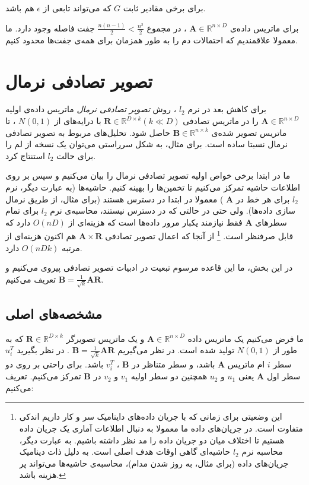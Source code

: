 برای برخی مقادیر ثابت 
$G$
که می‌تواند تابعی از 
$\epsilon$
هم باشد.

برای ماتریس داده‌ی
$\mathbf{A} \in \mathbb{R}^{n \times D}$
، در مجموع 
$\frac{n(n-1)}{2} < \frac{n^2}{2}$
جفت فاصله وجود دارد. ما معمولا علاقمندیم که احتمالات دم را به طور همزمان برای همه‌ی جفت‌ها محدود کنیم. 

\section{
تصویر تصادفی نرمال
\label{SecNormal}
}
برای کاهش بعد در نرم 
$l_2$
، روش 
\textit{
تصویر تصادفی نرمال
}
ماتریس داده‌ی اولیه 
$\mathbf{A} \in \mathbb{R}^{n \times D}$
را در ماتریس تصادفی 
$\mathbf{R} \in \mathbb{R}^{D \times k} (k \ll D)$
با درایه‌های 
از 
$N(0,1)$
، تا ماتریس تصویر شده‌ی 
$\mathbf{B} \in \mathbb{R}^{n \times k}$
حاصل شود. تحلیل‌های مربوط به تصویر تصادفی نرمال نسبتا ساده است. برای مثال، به شکل سرراستی می‌توان یک نسخه از لم 
\cite{litez103}
را برای حالت 
$l_2$
استنتاج کرد.

ما در ابتدا برخی خواص اولیه تصویر تصادفی نرمال را بیان می‌کنیم و سپس بر روی اطلاعات حاشیه تمرکز می‌کنیم تا تخمین‌ها را بهینه کنیم. حاشیه‌ها (به عبارت دیگر، نرم 
$l_2$
برای هر خط در 
$\mathbf{A}$
)
معمولا در ابتدا در دسترس هستند (برای مثال، از طریق نرمال سازی داده‌ها). ولی حتی در حالتی که در دسترس نیستند، محاسبه‌ی نرم 
$l_2$
برای تمام سطرهای 
$\mathbf{A}$
فقط نیازمند یکبار مرور داده‌ها است که هزینه‌ای از 
$O(nD)$
دارد که قابل صرفنظر است.
\footnote{
این وضعیتی برای زمانی که با جریان داده‌های داینامیک سر و کار داریم اندکی متفاوت است. در جریان‌های داده ما معمولا به دنبال اطلاعات آماری یک جریان داده هستیم تا اختلاف میان دو جریان داده را مد نظر داشته باشیم. به عبارت دیگر، محاسبه نرم 
$l_2$
حاشیه‌ای گاهی اوقات هدف اصلی است. به دلیل ذات دینامیک جریان‌های داده (برای مثال، به روز شدن مدام)، محاسبه‌ی حاشیه‌ها می‌تواند پر هزینه باشد.
}
از آنجا که اعمال تصویر تصادفی 
$\mathbf{A} \times \mathbf{R}$
هم اکنون هزینه‌ای از مرتبه 
$O(nDk)$
دارد.

در این بخش، ما این قاعده مرسوم تبعیت در ادبیات تصویر تصادفی 
\cite{litez166}
پیروی می‌کنیم و تعریف می‌کنیم
$\mathbf{B} = \frac{1}{\sqrt{k}} \mathbf{A} \mathbf{R}$.

\subsection{
مشخصه‌های اصلی
}

ما فرض می‌کنیم یک ماتریس داده 
$\mathbf{A} \in \mathbb{R}^{n \times D}$
و یک ماتریس تصویرگر
$\mathbf{R} \in \mathbb{R}^{D \times k}$
که به طور 
از 
$N(0,1)$
تولید شده است. در نظر می‌گیریم
$\mathbf{B} = \frac{1}{\sqrt{k}} \mathbf{A} \mathbf{R}$
.
در نظر بگیرید
$u_i^T$
سطر
$i$
ام ماتریس 
$\mathbf{A}$
باشد، و سطر متناظر در 
$\mathbf{B}$
،
$v_i^T$
باشد.
برای راحتی بر روی دو سطر اول 
$\mathbf{A}$
یعنی 
$u_1$
و
$u_2$
همچنین دو سطر اولیه
$v_1$
و 
$v_2$
در 
$\mathbf{B}$
تمرکز می‌کنیم. تعریف می‌کنیم:

